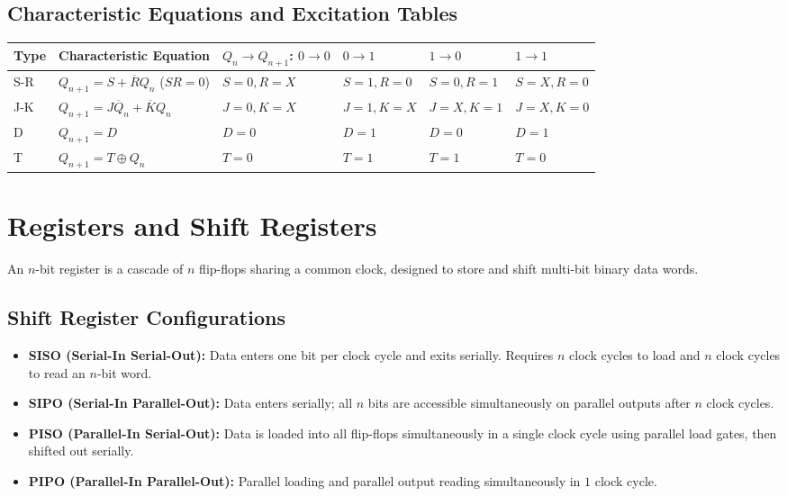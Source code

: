 \documentclass[12pt,a4paper]{article}
\renewcommand{\arraystretch}{1.45}
\begin{document}
\subsection{Characteristic Equations and Excitation Tables}
\par\vspace{6pt}\noindent
\begingroup
\setlength{\tabcolsep}{3.5pt}
\setlength{\extrarowheight}{3pt}
\renewcommand{\arraystretch}{1.35}
\begin{tabularx}{\linewidth}{|B{1.6cm}|B{3.2cm}|Y|Y|Y|Y|}
\hline
\textbf{Type} & \textbf{Characteristic Equation} & \textbf{$Q_n \to Q_{n+1}$: $0 \to 0$} & \textbf{$0 \to 1$} & \textbf{$1 \to 0$} & \textbf{$1 \to 1$} \\
\hline
S-R & $Q_{n+1} = S + \overline{R} Q_n$ ($S R = 0$) & $S=0, R=X$ & $S=1, R=0$ & $S=0, R=1$ & $S=X, R=0$ \\
\hline
J-K & $Q_{n+1} = J \overline{Q}_n + \overline{K} Q_n$ & $J=0, K=X$ & $J=1, K=X$ & $J=X, K=1$ & $J=X, K=0$ \\
\hline
D & $Q_{n+1} = D$ & $D = 0$ & $D = 1$ & $D = 0$ & $D = 1$ \\
\hline
T & $Q_{n+1} = T \oplus Q_n$ & $T = 0$ & $T = 1$ & $T = 1$ & $T = 0$ \\
\hline
\end{tabularx}
\endgroup

\section{Registers and Shift Registers}

An $n$-bit register is a cascade of $n$ flip-flops sharing a common clock, designed to store and shift multi-bit binary data words.

\subsection{Shift Register Configurations}
\begin{itemize}[leftmargin=*, itemsep=3pt]
  \item \textbf{SISO (Serial-In Serial-Out):} Data enters one bit per clock cycle and exits serially. Requires $n$ clock cycles to load and $n$ clock cycles to read an $n$-bit word.
  \item \textbf{SIPO (Serial-In Parallel-Out):} Data enters serially; all $n$ bits are accessible simultaneously on parallel outputs after $n$ clock cycles.
  \item \textbf{PISO (Parallel-In Serial-Out):} Data is loaded into all flip-flops simultaneously in a single clock cycle using parallel load gates, then shifted out serially.
  \item \textbf{PIPO (Parallel-In Parallel-Out):} Parallel loading and parallel output reading simultaneously in $1$ clock cycle.
\end{itemize}
\end{document}
